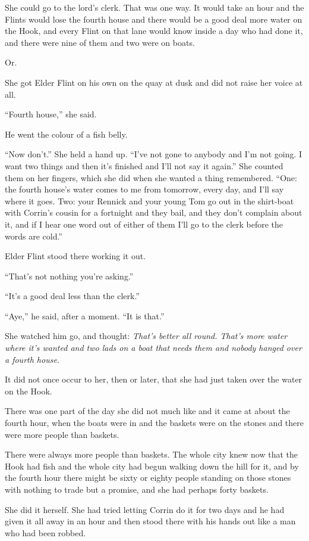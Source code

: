 She could go to the lord’s clerk. That was one way. It would take an hour and the Flints would lose the fourth house and there would be a good deal more water on the Hook, and every Flint on that lane would know inside a day who had done it, and there were nine of them and two were on boats.

Or.

She got Elder Flint on his own on the quay at dusk and did not raise her voice at all.

“Fourth house,” she said.

He went the colour of a fish belly.

“Now don’t.” She held a hand up. “I’ve not gone to anybody and I’m not going. I want two things and then it’s finished and I’ll not say it again.” She counted them on her fingers, which she did when she wanted a thing remembered. “One: the fourth house’s water comes to me from tomorrow, every day, and I’ll say where it goes. Two: your Rennick and your young Tom go out in the shirt-boat with Corrin’s cousin for a fortnight and they bail, and they don’t complain about it, and if I hear one word out of either of them I’ll go to the clerk before the words are cold.”

Elder Flint stood there working it out.

“That’s not nothing you’re asking.”

“It’s a good deal less than the clerk.”

“Aye,” he said, after a moment. “It is that.”

She watched him go, and thought: \textit{That’s better all round. That’s more water where it’s wanted and two lads on a boat that needs them and nobody hanged over a fourth house.}

It did not once occur to her, then or later, that she had just taken over the water on the Hook.

\sceneBreak

There was one part of the day she did not much like and it came at about the fourth hour, when the boats were in and the baskets were on the stones and there were more people than baskets.

There were always more people than baskets. The whole city knew now that the Hook had fish and the whole city had begun walking down the hill for it, and by the fourth hour there might be sixty or eighty people standing on those stones with nothing to trade but a promise, and she had perhaps forty baskets.

She did it herself. She had tried letting Corrin do it for two days and he had given it all away in an hour and then stood there with his hands out like a man who had been robbed.

